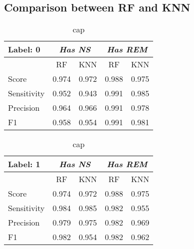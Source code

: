 \subsection{Comparison between RF and KNN}


\begin{table}
    \centering
\begin{tabular}{l|cc|cc}
	Label: 0 & \multicolumn{2}{c|}{\textit{Has NS}} & \multicolumn{2}{c}{\textit{Has REM}} \\
	\hline
            & RF & KNN & RF & KNN \\
    \hline 
    Score & 0.974 & 0.972 & 0.988 & 0.975 \\
    Sensitivity  & 0.952 & 0.943 & 0.991 & 0.985 \\
    Precision &  0.964 & 0.966 & 0.991 & 0.978\\
    F1 & 0.958 & 0.954 & 0.991 &  0.981\\
\hline
\end{tabular}
    \caption{cap}
    \label{tab:table_comp0}
\end{table}

\begin{table}
    \centering
\begin{tabular}{l|cc|cc}
	Label: 1 & \multicolumn{2}{c|}{\textit{Has NS}} & \multicolumn{2}{c}{\textit{Has REM}} \\
	\hline
            & RF & KNN & RF & KNN \\
    \hline 
    Score & 0.974 & 0.972 & 0.988 & 0.975 \\
    Sensitivity  & 0.984 & 0.985 & 0.982 & 0.955 \\
    Precision &  0.979 & 0.975 & 0.982 & 0.969\\
    F1 & 0.982 & 0.954 & 0.982 &  0.962\\
\hline
\end{tabular}
    \caption{cap}
    \label{tab:table_comp1}
\end{table}


